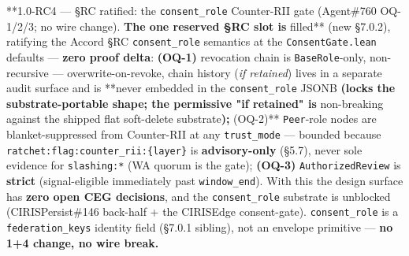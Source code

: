 \documentclass[11pt]{article}
\begin{document}
**1.0-RC4 — §RC ratified: the \texttt{consent\_role} Counter-RII gate (Agent\#760 OQ-1/2/3; no wire change).\textbf{ The one reserved §RC slot is }filled** (new §7.0.2), ratifying the Accord §RC \texttt{consent\_role} semantics at the \texttt{ConsentGate.lean} defaults — \textbf{zero proof delta}: \textbf{(OQ-1)} revocation chain is \texttt{BaseRole}-only, non-recursive — overwrite-on-revoke, chain history (\textit{if retained}) lives in a separate audit surface and is **never embedded in the \texttt{consent\_role} JSONB\textbf{ (locks the substrate-portable shape; the permissive "if retained" is }non-breaking against the shipped flat soft-delete substrate\textbf{); }(OQ-2)** \texttt{Peer}-role nodes are blanket-suppressed from Counter-RII at any \texttt{trust\_mode} — bounded because \texttt{ratchet:flag:counter\_rii:\{layer\}} is \textbf{advisory-only} (§5.7), never sole evidence for \texttt{slashing:*} (WA quorum is the gate); \textbf{(OQ-3)} \texttt{AuthorizedReview} is \textbf{strict} (signal-eligible immediately past \texttt{window\_end}). With this the design surface has \textbf{zero open CEG decisions}, and the \texttt{consent\_role} substrate is unblocked (CIRISPersist\#146 back-half + the CIRISEdge consent-gate). \texttt{consent\_role} is a \texttt{federation\_keys} identity field (§7.0.1 sibling), not an envelope primitive — \textbf{no 1+4 change, no wire break.}
\end{document}

